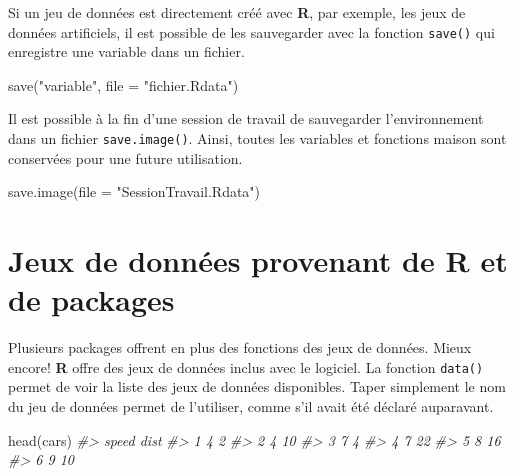 \documentclass[
]{book}
\newenvironment{Shaded}{}{}
\newcommand{\AttributeTok}[1]{#1}
\newcommand{\CommentTok}[1]{\textit{#1}}
\newcommand{\FunctionTok}[1]{#1}
\newcommand{\NormalTok}[1]{#1}
\newcommand{\StringTok}[1]{#1}
\begin{document}
Si un jeu de données est directement créé avec \textbf{R}, par exemple, les jeux de données artificiels, il est possible de les sauvegarder avec la fonction \texttt{save()} qui enregistre une variable dans un fichier.

\begin{Shaded}
\begin{Highlighting}[]
\FunctionTok{save}\NormalTok{(}\StringTok{"variable"}\NormalTok{, }\AttributeTok{file =} \StringTok{"fichier.Rdata"}\NormalTok{)}
\end{Highlighting}
\end{Shaded}

Il est possible à la fin d'une session de travail de sauvegarder l'environnement dans un fichier \texttt{save.image()}. Ainsi, toutes les variables et fonctions maison sont conservées pour une future utilisation.

\begin{Shaded}
\begin{Highlighting}[]
\FunctionTok{save.image}\NormalTok{(}\AttributeTok{file =} \StringTok{"SessionTravail.Rdata"}\NormalTok{)}
\end{Highlighting}
\end{Shaded}

\hypertarget{jeux-de-donnuxe9es-provenant-de-r-et-de-packages}{%
\section{\texorpdfstring{Jeux de données provenant de \textbf{R} et de packages}{Jeux de données provenant de R et de packages}}\label{jeux-de-donnuxe9es-provenant-de-r-et-de-packages}}

Plusieurs packages offrent en plus des fonctions des jeux de données. Mieux encore! \textbf{R} offre des jeux de données inclus avec le logiciel. La fonction \texttt{data()} permet de voir la liste des jeux de données disponibles. Taper simplement le nom du jeu de données permet de l'utiliser, comme s'il avait été déclaré auparavant.

\begin{Shaded}
\begin{Highlighting}[]
\FunctionTok{head}\NormalTok{(cars)}
\CommentTok{\#\textgreater{}   speed dist}
\CommentTok{\#\textgreater{} 1     4    2}
\CommentTok{\#\textgreater{} 2     4   10}
\CommentTok{\#\textgreater{} 3     7    4}
\CommentTok{\#\textgreater{} 4     7   22}
\CommentTok{\#\textgreater{} 5     8   16}
\CommentTok{\#\textgreater{} 6     9   10}
\end{Highlighting}
\end{Shaded}
\end{document}
